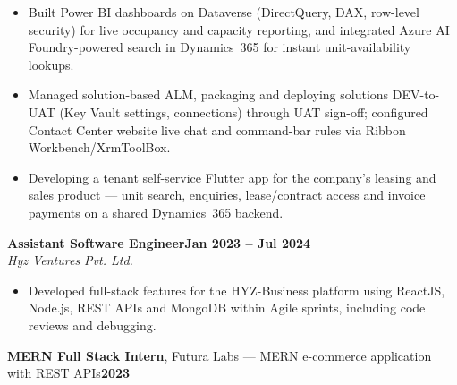 \documentclass[10pt,a4paper]{article}
\newcommand{\job}[3]{%
  \Needspace{5\baselineskip}%
  \textbf{#1}\hfill\textbf{#2}\\
  \textit{#3}\par\vspace{1pt}
}
\begin{document}
\begin{itemize}
  \item Built Power BI dashboards on Dataverse (DirectQuery, DAX, row-level security) for live occupancy and capacity reporting, and integrated Azure AI Foundry-powered search in Dynamics~365 for instant unit-availability lookups.
  \item Managed solution-based ALM, packaging and deploying solutions DEV-to-UAT (Key Vault settings, connections) through UAT sign-off; configured Contact Center website live chat and command-bar rules via Ribbon Workbench/XrmToolBox.
  \item Developing a tenant self-service Flutter app for the company's leasing and sales product --- unit search, enquiries, lease/contract access and invoice payments on a shared Dynamics~365 backend.
\end{itemize}

\vspace{2pt}
\job{Assistant Software Engineer}{Jan 2023 -- Jul 2024}{Hyz Ventures Pvt. Ltd.}
\begin{itemize}
  \item Developed full-stack features for the HYZ-Business platform using ReactJS, Node.js, REST APIs and MongoDB within Agile sprints, including code reviews and debugging.
\end{itemize}

\vspace{2pt}
\textbf{MERN Full Stack Intern}, Futura Labs --- MERN e-commerce application with REST APIs\hfill\textbf{2023}
\end{document}
